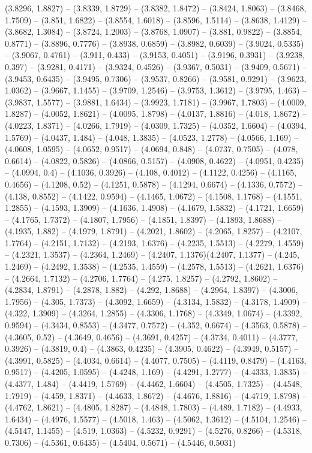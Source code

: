 (3.8296, 1.8827) -- (3.8339, 1.8729) -- (3.8382, 1.8472) -- (3.8424, 1.8063) -- (3.8468, 1.7509) -- (3.851, 1.6822) -- (3.8554, 1.6018) -- (3.8596, 1.5114) -- (3.8638, 1.4129) -- (3.8682, 1.3084) -- (3.8724, 1.2003) -- (3.8768, 1.0907) -- (3.881, 0.9822) -- (3.8854, 0.8771) -- (3.8896, 0.7776) -- (3.8938, 0.6859) -- (3.8982, 0.6039) -- (3.9024, 0.5335) -- (3.9067, 0.4761) -- (3.911, 0.433) -- (3.9153, 0.4051) -- (3.9196, 0.3931) -- (3.9238, 0.397) -- (3.9281, 0.4171) -- (3.9324, 0.4526) -- (3.9367, 0.5031) -- (3.9409, 0.5671) -- (3.9453, 0.6435) -- (3.9495, 0.7306) -- (3.9537, 0.8266) -- (3.9581, 0.9291) -- (3.9623, 1.0362) -- (3.9667, 1.1455) -- (3.9709, 1.2546) -- (3.9753, 1.3612) -- (3.9795, 1.463) -- (3.9837, 1.5577) -- (3.9881, 1.6434) -- (3.9923, 1.7181) -- (3.9967, 1.7803) -- (4.0009, 1.8287) -- (4.0052, 1.8621) -- (4.0095, 1.8798) -- (4.0137, 1.8816) -- (4.018, 1.8672) -- (4.0223, 1.8371) -- (4.0266, 1.7919) -- (4.0309, 1.7325) -- (4.0352, 1.6604) -- (4.0394, 1.5769) -- (4.0437, 1.484) -- (4.048, 1.3835) -- (4.0523, 1.2778) -- (4.0566, 1.169) -- (4.0608, 1.0595) -- (4.0652, 0.9517) -- (4.0694, 0.848) -- (4.0737, 0.7505) -- (4.078, 0.6614) -- (4.0822, 0.5826) -- (4.0866, 0.5157) -- (4.0908, 0.4622) -- (4.0951, 0.4235) -- (4.0994, 0.4) -- (4.1036, 0.3926) -- (4.108, 0.4012) -- (4.1122, 0.4256) -- (4.1165, 0.4656) -- (4.1208, 0.52) -- (4.1251, 0.5878) -- (4.1294, 0.6674) -- (4.1336, 0.7572) -- (4.138, 0.8552) -- (4.1422, 0.9594) -- (4.1465, 1.0672) -- (4.1508, 1.1768) -- (4.1551, 1.2855) -- (4.1593, 1.3909) -- (4.1636, 1.4908) -- (4.1679, 1.5832) -- (4.1721, 1.6659) -- (4.1765, 1.7372) -- (4.1807, 1.7956) -- (4.1851, 1.8397) -- (4.1893, 1.8688) -- (4.1935, 1.882) -- (4.1979, 1.8791) -- (4.2021, 1.8602) -- (4.2065, 1.8257) -- (4.2107, 1.7764) -- (4.2151, 1.7132) -- (4.2193, 1.6376) -- (4.2235, 1.5513) -- (4.2279, 1.4559) -- (4.2321, 1.3537) -- (4.2364, 1.2469) -- (4.2407, 1.1376)(4.2407, 1.1377) -- (4.245, 1.2469) -- (4.2492, 1.3538) -- (4.2535, 1.4559) -- (4.2578, 1.5513) -- (4.2621, 1.6376) -- (4.2664, 1.7132) -- (4.2706, 1.7764) -- (4.275, 1.8257) -- (4.2792, 1.8602) -- (4.2834, 1.8791) -- (4.2878, 1.882) -- (4.292, 1.8688) -- (4.2964, 1.8397) -- (4.3006, 1.7956) -- (4.305, 1.7373) -- (4.3092, 1.6659) -- (4.3134, 1.5832) -- (4.3178, 1.4909) -- (4.322, 1.3909) -- (4.3264, 1.2855) -- (4.3306, 1.1768) -- (4.3349, 1.0674) -- (4.3392, 0.9594) -- (4.3434, 0.8553) -- (4.3477, 0.7572) -- (4.352, 0.6674) -- (4.3563, 0.5878) -- (4.3605, 0.52) -- (4.3649, 0.4656) -- (4.3691, 0.4257) -- (4.3734, 0.4011) -- (4.3777, 0.3926) -- (4.3819, 0.4) -- (4.3863, 0.4235) -- (4.3905, 0.4622) -- (4.3949, 0.5157) -- (4.3991, 0.5825) -- (4.4034, 0.6614) -- (4.4077, 0.7505) -- (4.4119, 0.8479) -- (4.4163, 0.9517) -- (4.4205, 1.0595) -- (4.4248, 1.169) -- (4.4291, 1.2777) -- (4.4333, 1.3835) -- (4.4377, 1.484) -- (4.4419, 1.5769) -- (4.4462, 1.6604) -- (4.4505, 1.7325) -- (4.4548, 1.7919) -- (4.459, 1.8371) -- (4.4633, 1.8672) -- (4.4676, 1.8816) -- (4.4719, 1.8798) -- (4.4762, 1.8621) -- (4.4805, 1.8287) -- (4.4848, 1.7803) -- (4.489, 1.7182) -- (4.4933, 1.6434) -- (4.4976, 1.5577) -- (4.5018, 1.463) -- (4.5062, 1.3612) -- (4.5104, 1.2546) -- (4.5147, 1.1455) -- (4.519, 1.0363) -- (4.5232, 0.9291) -- (4.5276, 0.8266) -- (4.5318, 0.7306) -- (4.5361, 0.6435) -- (4.5404, 0.5671) -- (4.5446, 0.5031) 